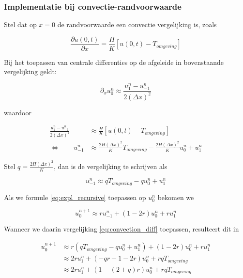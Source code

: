 \documentclass[a4paper,kulak]{kulakarticle} %
\begin{document}
\subsubsection{Implementatie bij convectie-randvoorwaarde}

Stel dat op $x = 0$ de randvoorwaarde een convectie vergelijking is, zoals

\begin{equation}
	\frac{\partial u(0, t)}{\partial x} = \frac{H}{K}\left[u(0, t) - T_{omgeving}\right]
	\label{eq:convection_term}
\end{equation}

Bij het toepassen van centrale differenties op de afgeleide in bovenstaande vergelijking geldt:

\begin{equation*}
	\partial_x u_0^n \approx \frac{u_1^n - u_{-1}^n}{2(\Delta x)^2}
\end{equation*}

waardoor

\begin{align*}
	\frac{u_1^n - u_{-1}^n}{2(\Delta x)^2} &\approx \frac{H}{K}\left[u(0, t) - T_{omgeving}\right] \\
	\Leftrightarrow \qquad
	u_{-1}^n &\approx 
	\frac{2 H (\Delta x)^2}{K} T_{omgeving} 
	- \frac{2 H (\Delta x)^2}{K} u_0^n
	+ u_1^n
\end{align*}

Stel $q = \frac{2 H (\Delta x)^2}{K}$, dan is de vergelijking te schrijven als

\begin{equation}
	u_{-1}^n \approx q T_{omgeving} - q u_0^n + u_1^n
	\label{eq:convection_diff}
\end{equation}

Als we formule \ref{eq:expl_recursive} toepassen op $u_0^n$ bekomen we

\begin{equation*}
	u_0^{n+1} \approx r u_{-1}^n + \left( 1 - 2r \right) u_0^n + r u_1^n 
\end{equation*}

Wanneer we daarin vergelijking \ref{eq:convection_diff} toepassen, resulteert dit in

\begin{align*}
	u_0^{n+1} 
	&\approx r \left(q T_{omgeving} - q u_0^n + u_1^n\right) 
	+ \left( 1 - 2r \right) u_0^n 
	+ r u_1^n \\
	&\approx 2 r u_1^n
	+ ( - q r + 1 - 2 r ) u_0^n
	+ r q T_{omgeving} \\
	&\approx 2 r u_1^n
	+ (1 - (2 + q)r) u_0^n
	+ r q T_{omgeving}
\end{align*}
\end{document}
